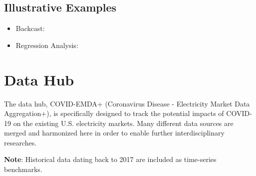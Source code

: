 \documentclass[11pt]{article}
\numberwithin{equation}{section}
\numberwithin{table}{section}
\numberwithin{figure}{section}
\begin{document}
\clearpage
\subsection{Illustrative Examples}

\begin{itemize}
  \item Backcast: 
  \item Regression Analysis: 
\end{itemize}



\newpage
\section{Data Hub} \label{sec:datahub}
The data hub, COVID-EMDA+ (Coronavirus Disease - Electricity Market Data Aggregation+), is specifically designed to track the potential impacts of COVID-19 on the existing U.S. electricity markets. Many different data sources are merged and harmonized here in order to enable further interdisciplinary researches. 

\textbf{Note}: Historical data dating back to 2017 are included as time-series benchmarks.
\end{document}
